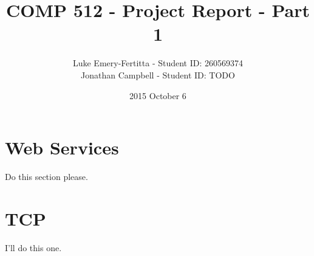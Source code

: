 \documentclass[11pt]{article}
\begin{document}
\title{COMP 512 - Project Report - Part 1}
\author{Luke Emery-Fertitta - Student ID: 260569374 \\ Jonathan Campbell - Student ID: TODO}
\date{2015 October 6}
\maketitle

\section{Web Services}

Do this section please. \par

\section{TCP}

I'll do this one. \par
\end{document}
